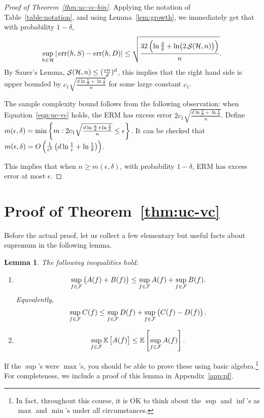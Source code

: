 \documentclass{article}
\newtheorem{lemma}{Lemma}
\DeclareMathOperator*{\err}{{\rm err}}
\DeclareMathOperator*{\Scal}{{\cal S}}
\newcommand{\EE}{\mathbb{E}}
\newcommand{\Hcal}{\mathcal{H}}
\newcommand{\Fcal}{\mathcal{F}}
\begin{document}
\begin{proof}[Proof of Theorem~\ref{thm:uc-vc-bin}]
Applying the notation of Table~\ref{table:notation}, and using Lemma~\ref{lem:growth},
we immediately get that with probability $1-\delta$,
\[ \sup_{h \in \Hcal} |\err(h,S) - \err(h,D)| \leq \sqrt{\frac{32\del{\ln\frac{2}{\delta} + \ln(2\Scal(\Hcal, n))}}{n}}. \]
By Sauer's Lemma, $\Scal(\Hcal, n) \leq (\frac{en}{d})^d$, this implies that the right hand side is upper bounded by $c_1 \sqrt{\frac{d\ln\frac{n}{d} + \ln\frac{2}{\delta}}{n}}$ for some large constant $c_1$.

The sample complexity bound follows from the following observation: when Equation~\ref{eqn:uc-vc} holds, the ERM has excess error
$2c_1 \sqrt{\frac{d\ln\frac{n}{d} + \ln\frac{2}{\delta}}{n}}$. Define
$m(\epsilon,\delta) = \min\cbr{m: 2c_1 \sqrt{\frac{d\ln\frac{n}{d} + \ln\frac{2}{\delta}}{n}} \leq \epsilon}$. It can be checked that
$m(\epsilon,\delta) = O\del{\frac{1}{\epsilon^2}\del{d \ln \frac1\epsilon + \ln\frac1\delta}}$.

This implies that when $n \geq m(\epsilon,\delta)$, with probability $1-\delta$, ERM has excess error at most $\epsilon$.
\end{proof}


\section{Proof of Theorem~\ref{thm:uc-vc}}

Before the actual proof, let us collect a few elementary but useful facts about supremum in the following lemma.
\begin{lemma}
The following inequalities hold:
\begin{enumerate}
  \item
  \[ \sup_{f \in \Fcal} \del{A(f) + B(f)} \leq \sup_{f \in \Fcal} A(f) + \sup_{f \in \Fcal} B(f). \]
  Equvalently,
  \[ \sup_{f \in \Fcal} C(f) \leq \sup_{f \in \Fcal} D(f) + \sup_{f \in \Fcal} \del{C(f) - D(f)}. \]
  \label{item:sup-sub}
  \item \[ \sup_{f \in \Fcal} \EE \sbr{A(f)} \leq \EE \sbr{\sup_{f \in \Fcal} A(f)}. \]
  \label{item:sup-exp}
\end{enumerate}
\label{lem:sup}
\end{lemma}
If the $\sup$'s were $\max$'s, you should be able to prove these using basic algebra.\footnote{In fact, throughout this course, it is OK to think about the $\sup$ and $\inf$'s as $\max$ and $\min$'s under all circumstances.} For completeness, we include a proof of this lemma in Appendix~\ref{app:pf}.
\end{document}
